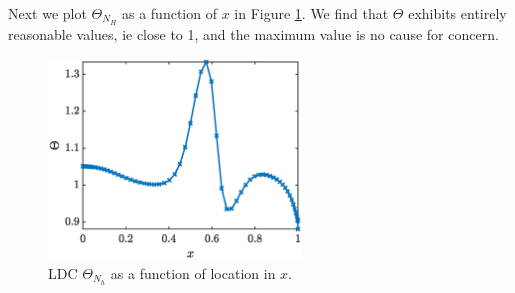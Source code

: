 \documentclass{report}
\begin{document}
Next we plot $\Theta_{N_H}$ as a function of $x$ in Figure \ref{fig:LDC_theta}. We find that $\Theta$ exhibits entirely reasonable values, ie close to 1, and the maximum value is no cause for concern. 
% 
\begin{figure}[ht!]
\centering
\includegraphics[width =0.6\textwidth]{Figures/LDC_theta.eps}
\caption{LDC $\Theta_{N_h}$ as a function of location in $x$.} 
\label{fig:LDC_theta}
\end{figure}
%
\end{document}
